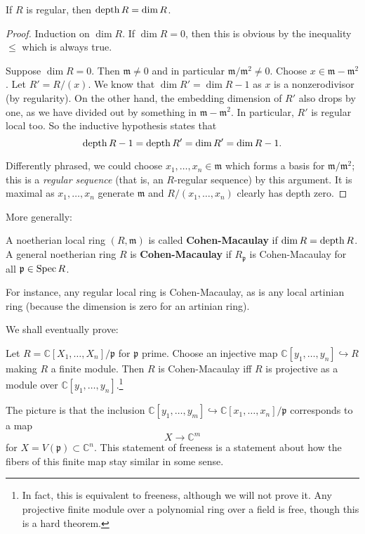 \begin{example}
If $R$ is regular, then $\operatorname{depth} R = \dim R$.
\end{example}
\begin{proof}
Induction on $\dim R$. If $\dim R=0$, then this is obvious by
the inequality
$\leq $ which is always true.

Suppose $\dim R = 0$. Then $\mathfrak{m} \neq 0$ and in
particular
$\mathfrak{m}/\mathfrak{m}^2 \neq 0$. Choose $x \in
\mathfrak{m}-
\mathfrak{m}^2$. Let $R'=R/(x)$. We know that $\dim R' = \dim
R-1$ as $x$ is a
nonzerodivisor (by regularity). On the other hand, the embedding
dimension of $R'$ also drops
by one, as we have divided out by something in $\mathfrak{m} -
\mathfrak{m}^2$.
In particular, $R'$ is regular local too. So the inductive
hypothesis states
that
\[\operatorname{depth} R-1 =  \operatorname{depth} R' = \dim R' = \dim R -1.   \]

Differently phrased, we could choose $x_1, \dots, x_n \in
\mathfrak{m}$ which forms a basis for
$\mathfrak{m}/\mathfrak{m}^2$; this is a
\emph{regular sequence} (that is, an $R$-regular sequence) by
this argument. It
is maximal as $x_1, \dots, x_n$ generate $\mathfrak{m}$ and
$R/(x_1, \dots,
x_n)$ clearly has depth zero.
\end{proof}

More generally:
\begin{definition}
A noetherian local ring $(R, \mathfrak{m})$ is called
\textbf{Cohen-Macaulay}
if $\dim R = \operatorname{depth} R$. A general noetherian ring $R$ is
\textbf{Cohen-Macaulay} if
$R_{\mathfrak{p}}$ is Cohen-Macaulay for all $\mathfrak{p} \in
\operatorname{Spec} R$.
\end{definition}
For instance, any regular local ring is Cohen-Macaulay, as is
any local
artinian ring (because the dimension is zero for an artinian
ring).

We shall eventually prove:

\begin{proposition}
Let $R = \mathbb{C}[X_1, \dots, X_n]/\mathfrak{p}$ for
$\mathfrak{p}$ prime.
Choose an injective map $\mathbb{C}[y_1, \dots, y_n]
\hookrightarrow R$ making $R$ a
finite module. Then $R$ is Cohen-Macaulay iff $R$ is projective
as a module
over $\mathbb{C}[y_1, \dots, y_n]$.\footnote{In fact, this is
equivalent to
freeness, although we will not prove it. Any projective finite
module over a
polynomial ring over a field is free, though this is a hard
theorem.}
\end{proposition}

The picture is that the inclusion $\mathbb{C}[y_1, \dots, y_m ]
\hookrightarrow
\mathbb{C}[x_1, \dots, x_n]/\mathfrak{p}$ corresponds to a map
\[ X \to \mathbb{C}^m  \]
for $X = V(\mathfrak{p}) \subset \mathbb{C}^n$. This statement
of freeness is a
statement about how the fibers of this finite map stay similar
in some sense.

